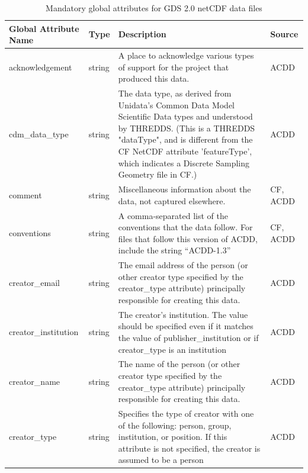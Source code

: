 \begin{longtable}{|p{}|p{}|p{}|p{}|}
\caption{Mandatory global attributes for GDS 2.0 netCDF data files}
\label{tab:global-attributes} \\
\hline \endfirsthead \endhead \endfoot \hline \endlastfoot
\rowcolor{blue!25} \textbf{Global Attribute Name} & \textbf{Type} & \textbf{Description} & \textbf{Source} \\ \hline
\rowcolor{cyan!25} 
acknowledgement & string & A place to acknowledge various types of support for the project that produced this data. & ACDD \\ \hline

\rowcolor{cyan!25} 
cdm\_data\_type & string & The data type, as derived from Unidata's Common Data Model Scientific Data types and understood by THREDDS. (This is a THREDDS "dataType", and is different from the CF NetCDF attribute 'featureType', which indicates a Discrete Sampling Geometry file in CF.) & ACDD \\ \hline

\rowcolor{cyan!25} 
comment & string & Miscellaneous information about the data, not captured elsewhere. & CF, ACDD \\ \hline

\rowcolor{cyan!25} 
conventions & string & A comma-separated list of the conventions that the data follow. For files that follow this version of ACDD, include the string “ACDD-1.3” & CF, ACDD \\ \hline

\rowcolor{cyan!25} 
creator\_email & string & The email address of the person (or other creator type specified by the creator\_type attribute) principally responsible for creating this data. & ACDD \\ \hline

\rowcolor{cyan!25} 
creator\_institution & string & The creator’s institution. The value should be specified even if it matches the value of publisher\_institution or if creator\_type is an institution & ACDD \\ \hline

\rowcolor{cyan!25} 
creator\_name & string & The name of the person (or other creator type specified by the creator\_type attribute) principally responsible for creating this data. & ACDD \\ \hline

\rowcolor{cyan!25} 
creator\_type & string & Specifies the type of creator with one of the following: person, group, institution, or position. If this attribute is not specified, the creator is assumed to be a person & ACDD \\ \hline


\end{longtable}
